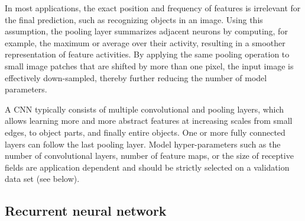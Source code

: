 In most applications, the exact position and frequency of features is irrelevant for the final prediction, such as recognizing objects in an image. Using this assumption, the pooling layer summarizes adjacent neurons by computing, for example, the maximum or average over their activity, resulting in a smoother representation of feature activities. By applying the same pooling operation to small image patches that are shifted by more than one pixel, the input image is effectively down-sampled, thereby further reducing the number of model parameters.

A CNN typically consists of multiple convolutional and pooling layers, which allows learning more and more abstract features at increasing scales from small edges, to object parts, and finally entire objects. One or more fully connected layers can follow the last pooling layer. Model hyper-parameters such as the number of convolutional layers, number of feature maps, or the size of receptive fields are application dependent and should be strictly selected on a validation data set (see below).


\subsection{Recurrent neural network} \label{sec:dl_rnn}

